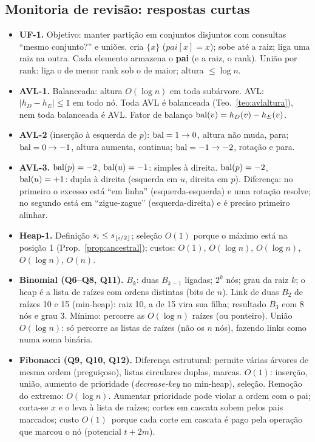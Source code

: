 \subsection{Monitoria de revisão: respostas curtas}
\begin{itemize}
  \item \textbf{UF-1.} Objetivo: manter partição em conjuntos disjuntos com consultas ``mesmo conjunto?'' e uniões. \MakeSet{} cria $\{x\}$ ($pai[x]=x$); \Find{} sobe até a raiz; \Union{} liga uma raiz na outra. Cada elemento armazena o \textbf{pai} (e a raiz, o rank). União por rank: liga o de menor rank sob o de maior; altura $\le\log n$.
  \item \textbf{AVL-1.} Balanceada: altura $O(\log n)$ em toda subárvore. AVL: $|h_D-h_E|\le1$ em todo nó. Toda AVL é balanceada (Teo.~\ref{teo:avlaltura}), nem toda balanceada é AVL. Fator de balanço $\operatorname{bal}(v)=h_D(v)-h_E(v)$.
  \item \textbf{AVL-2} (inserção à esquerda de $p$): $\operatorname{bal}=1\to0$, altura não muda, para; $\operatorname{bal}=0\to-1$, altura aumenta, continua; $\operatorname{bal}=-1\to-2$, rotação e para.
  \item \textbf{AVL-3.} $\operatorname{bal}(p)=-2$, $\operatorname{bal}(u)=-1$: simples à direita. $\operatorname{bal}(p)=-2$, $\operatorname{bal}(u)=+1$: dupla à direita (esquerda em $u$, direita em $p$). Diferença: no primeiro o excesso está ``em linha'' (esquerda-esquerda) e uma rotação resolve; no segundo está em ``zigue-zague'' (esquerda-direita) e é preciso primeiro alinhar.
  \item \textbf{Heap-1.} Definição $s_i\le s_{\lfloor i/2\rfloor}$; seleção $O(1)$ porque o máximo está na posição 1 (Prop.~\ref{prop:ancestral}); custos: $O(1)$, $O(\log n)$, $O(\log n)$, $O(\log n)$, $O(n)$.
  \item \textbf{Binomial (Q6--Q8, Q11).} $B_k$: duas $B_{k-1}$ ligadas; $2^k$ nós; grau da raiz $k$; o heap é a lista de raízes com ordens distintas (bits de $n$). Link de duas $B_2$ de raízes 10 e 15 (min-heap): raiz 10, a de 15 vira sua filha; resultado $B_3$ com 8 nós e grau 3. Mínimo: percorre as $O(\log n)$ raízes (ou ponteiro). União $O(\log n)$: só percorre as listas de raízes (não os $n$ nós), fazendo links como numa soma binária.
  \item \textbf{Fibonacci (Q9, Q10, Q12).} Diferença estrutural: permite várias árvores de mesma ordem (preguiçoso), listas circulares duplas, marcas. $O(1)$\am: inserção, união, aumento de prioridade (\emph{decrease-key} no min-heap), seleção. Remoção do extremo: $O(\log n)$\am. Aumentar prioridade pode violar a ordem com o pai; corta-se $x$ e o leva à lista de raízes; cortes em cascata sobem pelos pais marcados; custo $O(1)$\am\ porque cada corte em cascata é pago pela operação que marcou o nó (potencial $t+2m$).
\end{itemize}

